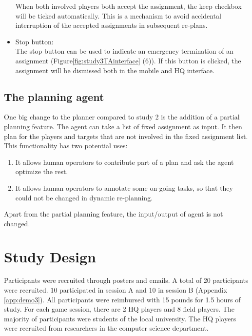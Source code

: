 \begin{itemize}
When both involved players both accept the assignment, the keep checkbox will be ticked automatically. This is a mechanism to avoid accidental interruption of the accepted assignments in subsequent re-plans. \\

\item Stop button: \\
The stop button can be used to indicate an emergency termination of an assignment (Figure\ref{fig:study3TAinterface} (6)). If this button is clicked, the assignment will be dismissed both in the mobile and HQ interface. \\
\end{itemize}



\subsection{The planning agent}\label{sec:studytwoagent}

One big change to the planner compared to study 2 is the addition of a partial planning feature. The agent can take a list of fixed assignment as input. It then plan for the players and targets that are not involved in the fixed assignment list. This functionality has two potential uses: \\

\begin{enumerate}
	\item It allows human operators to contribute part of a plan and ask the agent optimize the rest.\\
	\item It allows human operators to annotate some on-going tasks, so that they could not be changed in dynamic re-planning. \\
\end{enumerate}

Apart from the partial planning feature, the input/output of agent is not changed.\\


\section{Study Design}
Participants were recruited through posters and emails. A total of 20 participants were recruited. 10 participated in session A and 10 in session B (Appendix \ref{app:demo3}). All participants were reimbursed with 15 pounds for 1.5 hours of study. For each game session, there are 2 HQ players and 8 field players. The majority of participants were students of the local university. The HQ players were recruited from researchers in the computer science department. \\

